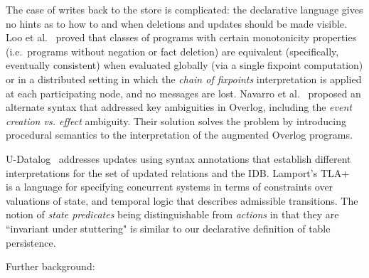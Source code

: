The case of writes back to the store is complicated: the declarative language gives no hints as to how to and when deletions and updates
should be made visible.  Loo et al.~\cite{loo-sigmod06} proved that classes of programs with certain monotonicity properties (i.e.\ programs without negation or fact deletion)
are equivalent (specifically, eventually consistent) when evaluated globally (via a single fixpoint computation) or in a distributed setting in which the 
\emph{chain of fixpoints} interpretation is applied at each participating node, and no messages are lost.
Navarro et al.~\cite{navarro} proposed an alternate syntax that addressed key ambiguities in Overlog, including the
\emph{event creation vs. effect} ambiguity.  Their solution solves the problem by introducing procedural semantics to the interpretation of 
the augmented Overlog programs.


U-Datalog~\cite{udatalog-neg} addresses updates using syntax annotations that establish different interpretations for the set of updated 
relations and the IDB.  Lamport's TLA+~\cite{tla} is a language for specifying concurrent systems in terms of constraints over valuations of
state, and temporal logic that describes admissible transitions.  The notion of \emph{state predicates} being distinguishable from \emph{actions}
in that they are ``invariant under stuttering" is similar to our declarative definition of table persistence.  

Further background: \cite{tccp,tdccp,prz, constructivism}
